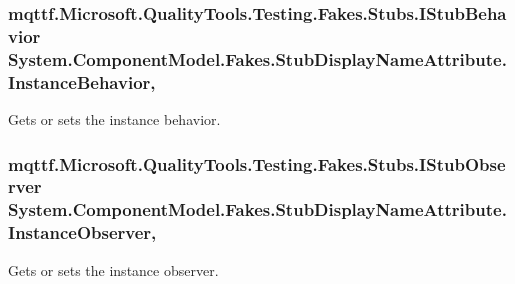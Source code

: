 \hypertarget{class_system_1_1_component_model_1_1_fakes_1_1_stub_display_name_attribute_a8991930cc6d37937dfd992d2139c3b49}{
\subsubsection[{Instance\-Behavior}]{\setlength{\rightskip}{0pt plus 5cm}mqttf.\-Microsoft.\-Quality\-Tools.\-Testing.\-Fakes.\-Stubs.\-I\-Stub\-Behavior System.\-Component\-Model.\-Fakes.\-Stub\-Display\-Name\-Attribute.\-Instance\-Behavior\hspace{0.3cm}{\ttfamily [get]}, {\ttfamily [set]}}}\label{class_system_1_1_component_model_1_1_fakes_1_1_stub_display_name_attribute_a8991930cc6d37937dfd992d2139c3b49}


Gets or sets the instance behavior.

\hypertarget{class_system_1_1_component_model_1_1_fakes_1_1_stub_display_name_attribute_a400f003cc59d2c57e0f45c35d84b252c}{
\subsubsection[{Instance\-Observer}]{\setlength{\rightskip}{0pt plus 5cm}mqttf.\-Microsoft.\-Quality\-Tools.\-Testing.\-Fakes.\-Stubs.\-I\-Stub\-Observer System.\-Component\-Model.\-Fakes.\-Stub\-Display\-Name\-Attribute.\-Instance\-Observer\hspace{0.3cm}{\ttfamily [get]}, {\ttfamily [set]}}}\label{class_system_1_1_component_model_1_1_fakes_1_1_stub_display_name_attribute_a400f003cc59d2c57e0f45c35d84b252c}


Gets or sets the instance observer.

